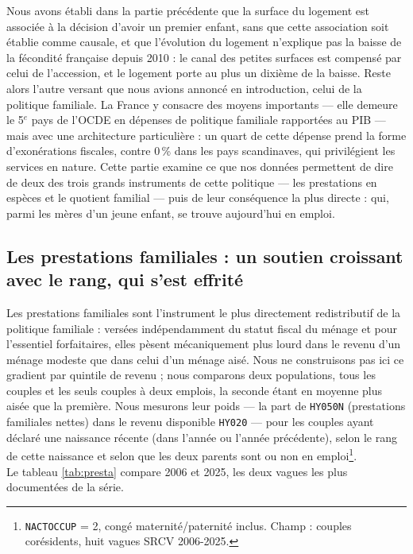 \documentclass[12pt,a4paper]{article}
\begin{document}
Nous avons établi dans la partie précédente que la surface du logement est associée à la décision d'avoir un premier enfant, sans que cette association soit établie comme causale, et que l'évolution du logement n'explique pas la baisse de la fécondité française depuis 2010 : le canal des petites surfaces est compensé par celui de l'accession, et le logement porte au plus un dixième de la baisse. Reste alors l'autre versant que nous avions annoncé en introduction, celui de la politique familiale. La France y consacre des moyens importants — elle demeure le 5$^e$ pays de l'OCDE en dépenses de politique familiale rapportées au PIB — mais avec une architecture particulière : un quart de cette dépense prend la forme d'exonérations fiscales, contre 0\,\% dans les pays scandinaves, qui privilégient les services en nature. Cette partie examine ce que nos données permettent de dire de deux des trois grands instruments de cette politique — les prestations en espèces et le quotient familial — puis de leur conséquence la plus directe : qui, parmi les mères d'un jeune enfant, se trouve aujourd'hui en emploi.

\subsection{Les prestations familiales : un soutien croissant avec le rang, qui s'est effrité}

Les prestations familiales sont l'instrument le plus directement redistributif de la politique familiale : versées indépendamment du statut fiscal du ménage et pour l'essentiel forfaitaires, elles pèsent mécaniquement plus lourd dans le revenu d'un ménage modeste que dans celui d'un ménage aisé. Nous ne construisons pas ici ce gradient par quintile de revenu ; nous comparons deux populations, tous les couples et les seuls couples à deux emplois, la seconde étant en moyenne plus aisée que la première. Nous mesurons leur poids — la part de \texttt{HY050N} (prestations familiales nettes) dans le revenu disponible \texttt{HY020} — pour les couples ayant déclaré une naissance récente (dans l'année ou l'année précédente), selon le rang de cette naissance et selon que les deux parents sont ou non en emploi\footnote{\texttt{NACTOCCUP} = 2, congé maternité/paternité inclus. Champ : couples corésidents, huit vagues SRCV 2006-2025.}. \\

\noindent Le tableau \ref{tab:presta} compare 2006 et 2025, les deux vagues les plus documentées de la série. \\
\end{document}
